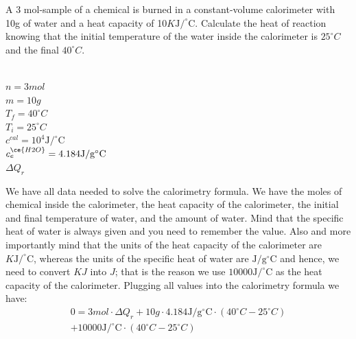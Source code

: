 \documentclass[main.tex]{subfiles}
\begin{document}
\begin{description}
\begin{example} %
A 3 mol-sample of a chemical is burned in a constant-volume calorimeter with 10g of water and a heat capacity of 10$K\text{J}/^{\circ}\text{C}$. Calculate the heat of reaction knowing that the initial temperature of the water inside the calorimeter is $25^{\circ}C$ and the final $40^{\circ}C$.
\\
\\
\begin{tcbitemize}[raster columns=3, raster rows=3, enhanced, sharp corners, raster equal height=rows, raster force size=false, raster column skip=0pt, raster row skip = 0pt]
\tcbitem[blankest, width=1cm]
\tcbitem[header = helpful]
\texta
\tcbitem[header = harmful]
\textb
\tcbitem[firstcol = internal]
\textcn
\tcbitem[swotbox = G]
$n=3mol$\\
$m=10g$\\
$T_{f}=40^{\circ}C$\\
$T_{i}=25^{\circ}C$\\
$c^{cal}=10^{4} \text{J}/^{\circ}\text{C}$\\
$c_{e}^{\ce{H2O}}=\\4.184 \text{J}/\text{g}^{\circ}\text{C}$\\
\tcbitem[swotbox = A]
$\Delta Q_{r}$\\
\end{tcbitemize}%
We have all data needed to solve the calorimetry formula. We have the moles of chemical inside the calorimeter, the heat capacity of the calorimeter, the initial and final temperature of water, and the amount of water. Mind that the specific heat of water is always given and you need to remember the value. Also and more importantly mind that the units of the heat capacity of the calorimeter are $K\text{J}/^{\circ}\text{C}$, whereas the units of the specific heat of water are $\text{J}/\text{g}^{\circ}\text{C}$ and hence, we need to convert $KJ$ into $J$; that is the reason we use $10000 \text{J}/^{\circ}\text{C}$ as the heat capacity of the calorimeter. Plugging all values into the calorimetry formula we have:\\
\begin{equation*}\begin{split}
0=3mol\cdot\Delta Q_{r}+10g\cdot 4.184 \text{J}/\text{g}^{\circ}\text{C}\cdot  (40^{\circ}C-25^{\circ}C)  \\
+10000 \text{J}/^{\circ}\text{C}\cdot  (40^{\circ}C-25^{\circ}C) \end{split}\end{equation*}

\end{example}
\end{description}
\end{document}
